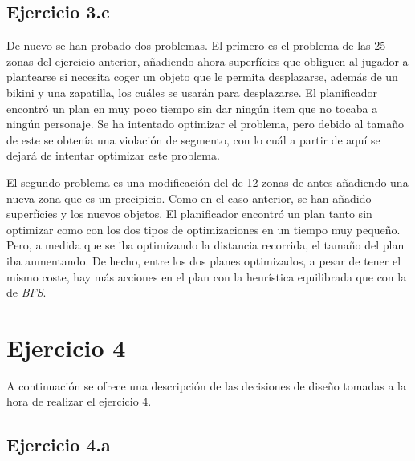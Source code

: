 \documentclass[11pt,a4paper]{article}
\begin{document}
\subsection{Ejercicio 3.c}

De nuevo se han probado dos problemas. El primero es el problema de las 25 zonas del ejercicio anterior, añadiendo ahora
superfícies que obliguen al jugador a plantearse si necesita coger un objeto que le permita desplazarse, además de un bikini y una
zapatilla, los cuáles se usarán para desplazarse. El planificador encontró un plan en muy poco tiempo sin dar ningún item que no
tocaba a ningún personaje. Se ha intentado optimizar el problema, pero debido al tamaño de este se obtenía una violación de segmento,
con lo cuál a partir de aquí se dejará de intentar optimizar este problema.

El segundo problema es una modificación del de 12 zonas de antes añadiendo una nueva zona que es un precipicio. Como en el caso
anterior, se han añadido superfícies y los nuevos objetos. El planificador encontró un plan tanto sin optimizar como con los dos
tipos de optimizaciones en un tiempo muy pequeño. Pero, a medida que se iba optimizando la distancia recorrida, el tamaño del plan
iba aumentando. De hecho, entre los dos planes optimizados, a pesar de tener el mismo coste, hay más acciones en el plan con la
heurística equilibrada que con la de \textit{BFS}.

\section{Ejercicio 4}

A continuación se ofrece una descripción de las decisiones de diseño tomadas a la hora de realizar el ejercicio 4.

\subsection{Ejercicio 4.a}
\end{document}
